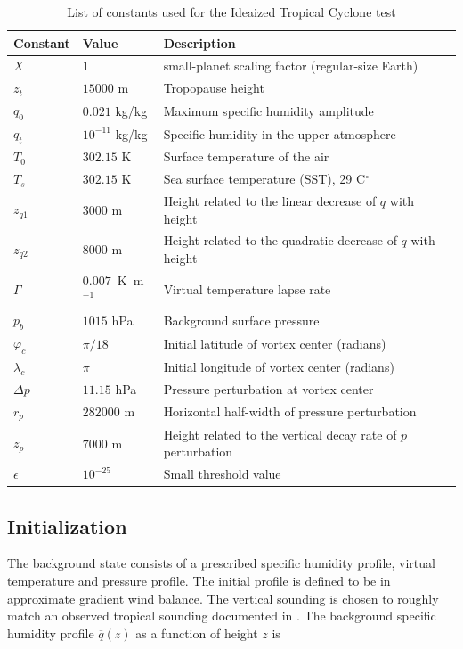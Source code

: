\documentclass[times,doublespace]{fldauth}
\begin{document}
\begin{table}[h]

\caption{List of constants used for the Ideaized Tropical Cyclone test}

\begin{tabular*}{\textwidth}{@{\extracolsep{\fill}}lll}
\hline Constant & Value & Description \\
\hline
$X$ & $1$ & small-planet scaling factor (regular-size Earth)\\
$z_t$ & $15000$ m & Tropopause height \\
$q_0$ & $0.021$ kg/kg & Maximum specific humidity amplitude \\
$q_t$ & $10^{-11}$ kg/kg & Specific humidity in the upper atmosphere \\
$T_0$ & $302.15$ K & Surface temperature of the air \\
$T_s$ & $302.15$ K & Sea surface temperature (SST), 29 C$^\circ$\\
$z_{q1}$ & $3000$ m & Height related to the linear decrease of $q$ with height \\
$z_{q2}$ & $8000$ m & Height related to the quadratic decrease of $q$ with height \\
$\Gamma$ & $0.007$\ K\ m$^{-1}$ & Virtual temperature lapse rate \\
$p_{b}$ & $1015$ hPa & Background surface pressure \\
$\varphi_c$ & $\pi / 18$ & Initial latitude of vortex center (radians) \\
$\lambda_c$ & $\pi$ & Initial longitude of vortex center (radians) \\
$\Delta p$ & $11.15$ hPa & Pressure perturbation at vortex center \\
$r_p$ & $282000$ m & Horizontal half-width of pressure perturbation \\
$z_p$ & $7000$ m & Height related to the vertical decay rate of $p$ perturbation \\
$\epsilon$ & $10^{-25}$ & Small threshold value \\
\hline 
\end{tabular*}

\end{table}

\subsection{Initialization}

The background state consists of a prescribed specific humidity profile, virtual temperature and pressure profile.  The initial profile is defined to be in approximate gradient wind balance.  The vertical sounding is chosen to roughly match an observed tropical sounding documented in \cite{jordan1958mean}.  The background specific humidity profile $\overline{q}(z)$ as a function of height $z$ is
\end{document}
